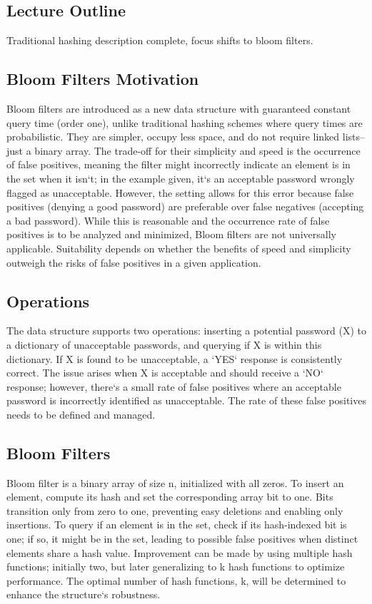 \subsection*{Lecture Outline}
Traditional hashing description complete, focus shifts to bloom filters.

\subsection*{Bloom Filters  Motivation}
Bloom filters are introduced as a new data structure with guaranteed constant query time (order one), unlike traditional hashing schemes where query times are probabilistic.
They are simpler, occupy less space, and do not require linked lists--just a binary array.
The trade-off for their simplicity and speed is the occurrence of false positives, meaning the filter might incorrectly indicate an element is in the set when it isn`t; in the example given, it`s an acceptable password wrongly flagged as unacceptable.
However, the setting allows for this error because false positives (denying a good password) are preferable over false negatives (accepting a bad password).
While this is reasonable and the occurrence rate of false positives is to be analyzed and minimized, Bloom filters are not universally applicable.
Suitability depends on whether the benefits of speed and simplicity outweigh the risks of false positives in a given application.

\subsection*{Operations}
The data structure supports two operations: inserting a potential password (X) to a dictionary of unacceptable passwords, and querying if X is within this dictionary.
If X is found to be unacceptable, a `YES` response is consistently correct.
The issue arises when X is acceptable and should receive a `NO` response; however, there`s a small rate of false positives where an acceptable password is incorrectly identified as unacceptable.
The rate of these false positives needs to be defined and managed.

\subsection*{Bloom Filters}
Bloom filter is a binary array of size n, initialized with all zeros.
To insert an element, compute its hash and set the corresponding array bit to one.
Bits transition only from zero to one, preventing easy deletions and enabling only insertions.
To query if an element is in the set, check if its hash-indexed bit is one; if so, it might be in the set, leading to possible false positives when distinct elements share a hash value.
Improvement can be made by using multiple hash functions; initially two, but later generalizing to k hash functions to optimize performance.
The optimal number of hash functions, k, will be determined to enhance the structure`s robustness.

